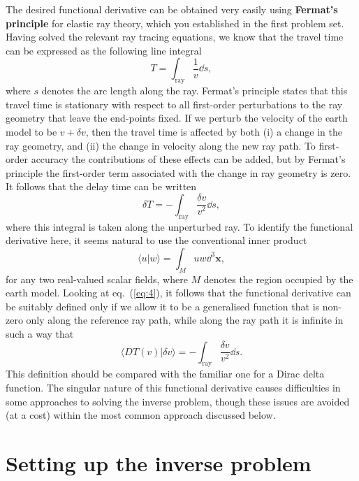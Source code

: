 The desired functional derivative can be obtained very easily using \textbf{Fermat's principle} for elastic ray theory, which you 
established in the first problem set. Having solved the relevant ray tracing equations, we know that the travel time can 
be expressed as the following line integral
\begin{equation}
    T = \int_{\mathrm{ray}} \frac{1}{v} \dd s,
    \label{eq:3}
\end{equation}
where $s$ denotes the arc length along the ray. Fermat's principle states that this travel time is stationary with respect 
to all first-order perturbations to the ray geometry that leave the end-points fixed. If we perturb the velocity of the 
earth model to be $v+\delta v$, then the travel time is affected by both (i) a change in the ray geometry, and (ii) the 
change in velocity along the new ray path. To first-order accuracy the contributions of these effects can be added, but 
by Fermat's principle the first-order term associated with the change in ray geometry is zero. It follows that the delay 
time can be written
\begin{equation}
    \delta T = -\int_{\mathrm{ray}} \frac{\delta v}{v^{2}} \dd s,
    \label{eq:4}
\end{equation}
where this integral is taken along the unperturbed ray. To identify the functional derivative here, it seems natural to use 
the conventional inner product
\begin{equation}
    \langle u|w \rangle = \int_{M} uw \dd^{3}\mathbf{x},
    \label{eq:5}
\end{equation}
for any two real-valued scalar fields, where $M$ denotes the region occupied by the earth model. Looking at eq.~(\ref{eq:4}), it follows that the functional derivative 
can be suitably defined only if we allow it to be a generalised function that is non-zero only along the reference ray path, 
while along the ray path it is infinite in such a way that
\begin{equation}
    \langle DT(v)|\delta v \rangle = -\int_{\mathrm{ray}} \frac{\delta v}{v^{2}} \dd s.
    \label{eq:6}
\end{equation}
This definition should be compared with the familiar one for a Dirac delta function. The singular nature of this functional 
derivative causes difficulties in some approaches to solving the inverse problem, though these issues are avoided (at a cost) 
within the most common approach discussed below.

\section*{Setting up the inverse problem}

